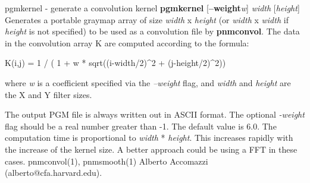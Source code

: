 %

\newpage
%

pgmkernel - generate a convolution kernel
{\bf pgmkernel} [{\bf --weight}{\it w}] {\it width} [{\it height}]
Generates a portable graymap array of size
{\it width} x {\it height} (or {\it width} x {\it width} if {\it height}
is not specified) to be used as a convolution file by
{\bf pnmconvol}{\rm .}
The data in the convolution array K are computed according to the
formula:
\par
K(i,j) = 1 / ( 1 + w * sqrt((i-width/2)\^{}2 + (j-height/2)\^{}2)) 
\par
where 
{\it w}
is a coefficient specified via the 
{\it --weight}
flag, and
{\it width}
and 
{\it height}
are the X and Y filter sizes.
\par
The output PGM file is always written out in ASCII format.
The optional 
{\it -weight}
flag should be a real number greater than -1.
The default value is 6.0.
The computation time is proportional to 
{\it width}
* 
{\it height}{\rm .}
This increases rapidly with the increase of the kernel size.  
A better approach could be using a FFT in these cases.
pnmconvol(1), pnmsmooth(1)
Alberto Accomazzi (alberto@cfa.harvard.edu).
%

%

\newpage
%

